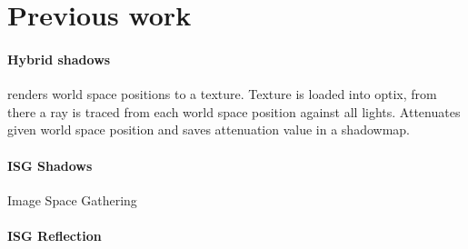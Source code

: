 \section{Previous work}

\paragraph{Hybrid shadows} renders world space positions to a texture. Texture is loaded into optix, from there a ray is traced from each world space position against all lights. Attenuates given world space position and saves attenuation value in a shadowmap.

\paragraph{ISG Shadows} Image Space Gathering \cite{nvidiarobison09}
\paragraph{ISG Reflection}


